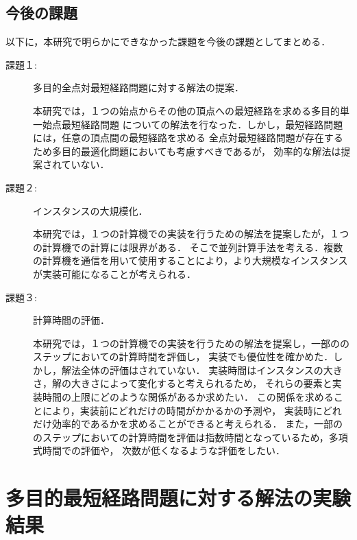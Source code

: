 \documentclass[12pt]{optlab-bachelor}
\renewcommand{\bibname}{参考文献}
\begin{document}
\section{今後の課題}
以下に，本研究で明らかにできなかった課題を今後の課題としてまとめる．

\begin{description}
  \item[課題１:]
  多目的全点対最短経路問題に対する解法の提案．

  本研究では，１つの始点からその他の頂点への最短経路を求める多目的単一始点最短経路問題
  についての解法を行なった．しかし，最短経路問題には，任意の頂点間の最短経路を求める
  全点対最短経路問題が存在するため多目的最適化問題においても考慮すべきであるが，
  効率的な解法は提案されていない．

\end{description}



\begin{description}
  \item[課題２:]
  インスタンスの大規模化．

  本研究では，１つの計算機での実装を行うための解法を提案したが，１つの計算機での計算には限界がある．
  そこで並列計算手法を考える．複数の計算機を通信を用いて使用することにより，より大規模なインスタンス
  が実装可能になることが考えられる．

\end{description}

\begin{description}
  \item[課題３:]
  計算時間の評価．

  本研究では，１つの計算機での実装を行うための解法を提案し，一部ののステップにおいての計算時間を評価し，
  実装でも優位性を確かめた．しかし，解法全体の評価はされていない．
  実装時間はインスタンスの大きさ，解の大きさによって変化すると考えられるため，
  それらの要素と実装時間の上限にどのような関係があるか求めたい．
  この関係を求めることにより，実装前にどれだけの時間がかかるかの予測や，
  実装時にどれだけ効率的であるかを求めることができると考えられる．
  また，一部ののステップにおいての計算時間を評価は指数時間となっているため，多項式時間での評価や，
  次数が低くなるような評価をしたい．

\end{description}



\addcontentsline{toc}{chapter}{\bibname}

\appendix

\chapter{多目的最短経路問題に対する解法の実験結果}
\end{document}

